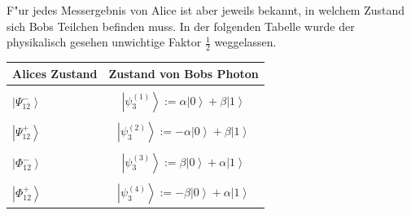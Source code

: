 \begin{refsection}
F"ur jedes Messergebnis von Alice ist aber jeweils bekannt, in welchem Zustand sich Bobs Teilchen befinden muss. In der folgenden Tabelle wurde der physikalisch gesehen unwichtige Faktor $\frac{1}{2}$ weggelassen.
\begin{center}
   \begin{tabular}{| l | c |}
   \hline
   Alices Zustand & Zustand von Bobs Photon \\
    \hline \\[8pt]
     $\left| \Psi_{12}^{-} \right\rangle$ & $ \left| \psi_{3}^{(1)} \right\rangle := \alpha \left| 0 \right \rangle + \beta \left| 1 \right \rangle $ \\[8pt] \hline \\[8pt]
     $\left| \Psi_{12}^{+} \right\rangle$ & $ \left| \psi_{3}^{(2)} \right\rangle := -\alpha \left| 0 \right \rangle + \beta \left| 1 \right \rangle $ \\[8pt] \hline \\[8pt]
     $\left| \Phi_{12}^{-} \right\rangle$ & $ \left| \psi_{3}^{(3)} \right\rangle := \beta \left| 0 \right \rangle + \alpha \left| 1 \right \rangle $ \\[8pt] \hline \\[8pt]
     $\left| \Phi_{12}^{+} \right\rangle$ & $ \left| \psi_{3}^{(4)} \right\rangle := -\beta \left| 0 \right \rangle + \alpha \left| 1 \right \rangle $  \\[8pt] \hline
          

\end{tabular}
\end{center}
\end{refsection}
